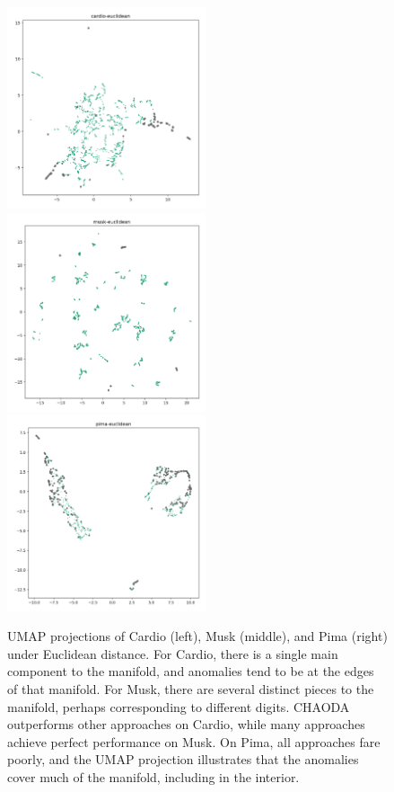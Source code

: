 \begin{figure}
   \centering
   \includegraphics[width=2.3in]{images/umaps/cardio-euclidean-umap2d.png}
   \includegraphics[width=2.3in]{images/umaps/musk-euclidean-umap2d.png}
   \includegraphics[width=2.3in]{images/umaps/pima-euclidean-umap2d.png}
   \caption{UMAP projections of Cardio (left), Musk (middle), and Pima (right) under Euclidean distance.
   For Cardio, there is a single main component to the manifold, and anomalies tend to be at the edges of that manifold.
   For Musk, there are several distinct pieces to the manifold, perhaps corresponding to different digits.
   CHAODA outperforms other approaches on Cardio, while many approaches achieve perfect performance on Musk. On Pima, all approaches fare poorly, and the UMAP projection illustrates that the anomalies cover much of the manifold, including in the interior.}
   \label{fig:conclusions:umap-embeddings-1}
\end{figure}
